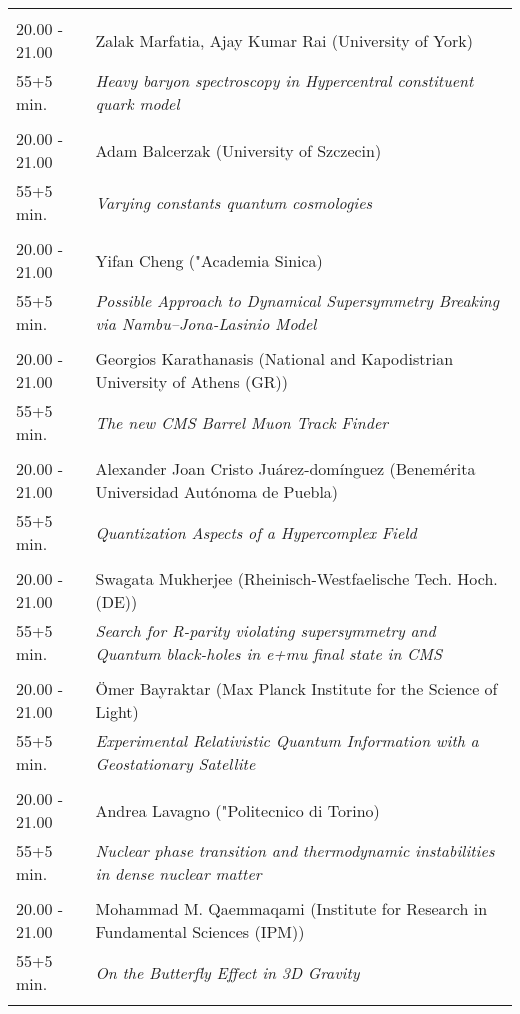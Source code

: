 \begin{longtable}{p{3cm}p{13cm}}
 & \\ 
20.00 - 21.00 & Zalak Marfatia, Ajay Kumar Rai (University of York)\\ 
55+5 min. & {\it Heavy baryon spectroscopy in Hypercentral constituent quark model}\\ 
 & \\ 
20.00 - 21.00 & Adam Balcerzak (University of Szczecin)\\ 
55+5 min. & {\it Varying constants quantum cosmologies}\\ 
 & \\ 
20.00 - 21.00 & Yifan Cheng ("Academia Sinica)\\ 
55+5 min. & {\it Possible Approach to Dynamical Supersymmetry Breaking via Nambu--Jona-Lasinio Model}\\ 
 & \\ 
20.00 - 21.00 & Georgios Karathanasis (National and Kapodistrian University of Athens (GR))\\ 
55+5 min. & {\it The new CMS Barrel Muon Track Finder}\\ 
 & \\ 
20.00 - 21.00 & Alexander Joan Cristo Juárez-domínguez (Benemérita Universidad Autónoma de Puebla)\\ 
55+5 min. & {\it Quantization Aspects of a Hypercomplex Field}\\ 
 & \\ 
20.00 - 21.00 & Swagata Mukherjee (Rheinisch-Westfaelische Tech. Hoch. (DE))\\ 
55+5 min. & {\it Search for R-parity violating supersymmetry and Quantum black-holes in e+mu final state in CMS}\\ 
 & \\ 
20.00 - 21.00 & Ömer Bayraktar (Max Planck Institute for the Science of Light)\\ 
55+5 min. & {\it Experimental Relativistic Quantum Information with a Geostationary Satellite}\\ 
 & \\ 
20.00 - 21.00 & Andrea Lavagno ("Politecnico di Torino)\\ 
55+5 min. & {\it Nuclear phase transition and thermodynamic instabilities in dense nuclear matter}\\ 
 & \\ 
20.00 - 21.00 & Mohammad M. Qaemmaqami (Institute for Research in Fundamental Sciences (IPM))\\ 
55+5 min. & {\it On the Butterfly Effect in 3D Gravity}\\ 
 & \\ 

\end{longtable}
